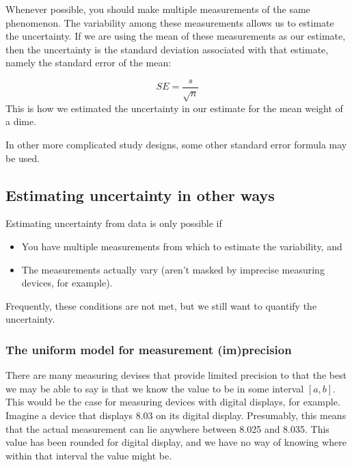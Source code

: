 \documentclass[twoside]{book}\usepackage[]{graphicx}\usepackage[]{xcolor}
\newcounter{example}[section]
\begin{document}
Whenever possible, you should make multiple measurements of the same phenomenon.
The variability among these measurements allows us to estimate the uncertainty.
If we are using the mean of these measurements as our estimate, then the uncertainty
is the standard deviation associated with that estimate, namely
the standard error of the mean:

\[ 
SE = \frac{s}{\sqrt{n}} 
\]
This is how we estimated the uncertainty in our estimate for the mean weight of a dime.

In other more complicated study designs, some other standard error formula may be used.

\subsection{Estimating uncertainty in other ways}
\label{sec:uncertainty-without-data}
Estimating uncertainty from data is only possible if 
\begin{itemize}
\item You have multiple measurements from which to estimate the variability, and 
\item The measurements actually vary (aren't masked by imprecise measuring devices, 
for example).
\end{itemize}

Frequently, these conditions are not met, but we still want to quantify the uncertainty.

\subsubsection{The uniform model for measurement (im)precision}
There are many measuring devises that provide limited precision to that the 
best we may be able to say is that we know the value to be in some interval $[a,b]$.
This would be the case for measuring devices with digital displays, for example.  
Imagine a device that displays 8.03 on its digital display.  
Presumably, this means that the actual measurement can lie anywhere between 
8.025 and 8.035.  This value has been rounded for digital display, and we 
have no way of knowing where within that interval the value might be.

\end{document}
